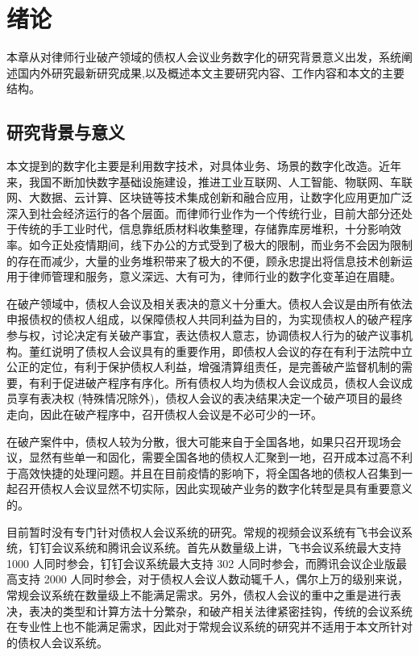 
\chapter{绪论}
本章从对律师行业破产领域的债权人会议业务数字化的研究背景意义出发，系统阐述国内外研究最新研究成果,以及概述本文主要研究内容、工作内容和本文的主要结构。

\section{研究背景与意义}
本文提到的数字化主要是利用数字技术，对具体业务、场景的数字化改造\cite{ShuZiHua}。近年来，我国不断加快数字基础设施建设，推进工业互联网、人工智能、物联网、车联网、大数据、云计算、区块链等技术集成创新和融合应用，让数字化应用更加广泛深入到社会经济运行的各个层面。而律师行业作为一个传统行业，目前大部分还处于传统的手工业时代，信息靠纸质材料收集整理，存储靠库房堆积，十分影响效率。如今正处疫情期间，线下办公的方式受到了极大的限制，而业务不会因为限制的存在而减少，大量的业务堆积带来了极大的不便，顾永忠\cite{Gu}提出将信息技术创新运用于律师管理和服务，意义深远、大有可为，律师行业的数字化变革迫在眉睫。

在破产领域中，债权人会议及相关表决的意义十分重大。债权人会议是由所有依法申报债权的债权人组成，以保障债权人共同利益为目的，为实现债权人的破产程序参与权，讨论决定有关破产事宜，表达债权人意志，协调债权人行为的破产议事机构。董红\cite{Dong}说明了债权人会议具有的重要作用，即债权人会议的存在有利于法院中立公正的定位，有利于保护债权人利益，增强清算组责任，是完善破产监督机制的需要，有利于促进破产程序有序化。所有债权人均为债权人会议成员，债权人会议成员享有表决权 (特殊情况除外)，债权人会议的表决结果决定一个破产项目的最终走向，因此在破产程序中，召开债权人会议是不必可少的一环。

在破产案件中，债权人较为分散，很大可能来自于全国各地，如果只召开现场会议，显然有些单一和固化，需要全国各地的债权人汇聚到一地，召开成本过高不利于高效快捷的处理问题。并且在目前疫情的影响下，将全国各地的债权人召集到一起召开债权人会议显然不切实际，因此实现破产业务的数字化转型是具有重要意义的。

目前暂时没有专门针对债权人会议系统的研究。常规的视频会议系统有飞书会议系统，钉钉会议系统和腾讯会议系统。首先从数量级上讲，飞书会议系统最大支持 1000 人同时参会，钉钉会议系统最大支持 302 人同时参会，而腾讯会议企业版最高支持 2000 人同时参会，对于债权人会议人数动辄千人，偶尔上万的级别来说，常规会议系统在数量级上不能满足需求。另外，债权人会议的重中之重是进行表决，表决的类型和计算方法十分繁杂，和破产相关法律紧密挂钩，传统的会议系统在专业性上也不能满足需求，因此对于常规会议系统的研究并不适用于本文所针对的债权人会议系统。


